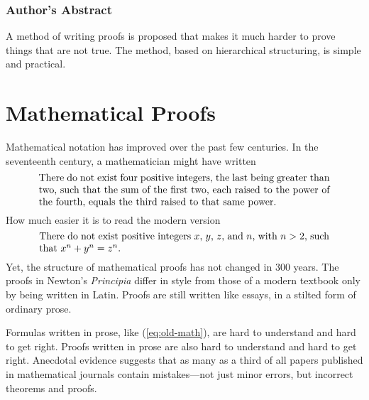 \cleardoublepage
\thispagestyle{empty}

\subsubsection*{Author's Abstract} 
\vspace{-2pt} 

A method of writing proofs is proposed that makes it much harder to
prove things that are not true.  The method, based on hierarchical
structuring, is simple and practical.

\cleardoublepage
\thispagestyle{empty}
\tableofcontents
\thispagestyle{empty}

\cleardoublepage
{}


\section{Mathematical Proofs}

Mathematical notation has improved over the past few centuries.  In the
seventeenth century, a mathematician might have written
\begin{equation} \label{eq:old-math}
 \begin{minipage}{.85\textwidth}
    There do not exist four positive integers, the last being greater than
    two, such that the sum of the first two, each raised to the power of
    the fourth, equals the third raised to that same power.
 \end{minipage}
\end{equation}
How much easier it is to read the modern version
\begin{equation} \label{eq:new-math}
 \begin{minipage}{.85\textwidth}
    There do not exist positive integers $x$, $y$, $z$, and $n$,
    with $n>2$, such that $x^{n}+y^{n}=z^{n}$.
 \end{minipage}
\end{equation}
Yet, the structure of mathematical proofs has not changed in 300 years.
The proofs in Newton's {\em Principia\/} differ in style from those of
a modern textbook only by being written in Latin.  Proofs are still
written like essays, in a stilted form of ordinary prose.

Formulas written in prose, like (\ref{eq:old-math}), are hard to
understand and hard to get right.  Proofs written in prose are also hard to
understand and hard to get right.  Anecdotal evidence suggests that as
many as a third of all papers published in mathematical journals
contain mistakes---not just minor errors, but incorrect theorems and
proofs.

